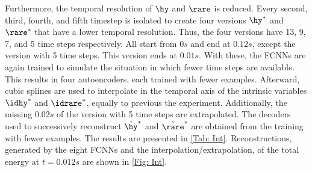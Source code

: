 Furthermore, the temporal resolution of \(\hy\) and \(\rare\) is reduced. Every second, third, fourth, and fifth timestep is isolated to create four versions \(\hy^*\) and \(\rare^*\) that have a lower temporal resolution. Thus, the four versions have 13, 9, 7, and 5 time steps respectively. All start from \(0s\) and end at \(0.12s\), except the version with 5 time steps. This version ends at \(0.01s\). With these, the FCNNs are again trained to simulate the situation in which fewer time steps are available. This results in four autoencoders, each trained with fewer examples. Afterward, cubic splines are used to interpolate in the temporal axis of the intrinsic variables \(\idhy^*\) and \(\idrare^*\), equally to previous the experiment. Additionally, the missing \(0.02s\)  of the version with 5 time steps are extrapolated. The decoders used to successively reconstruct \(\tilde{\hy}^*\) and \(\tilde{\rare}^*\) are obtained from the training with fewer examples. The results are presented in \cref{Tab: Int}. Reconstructions, generated by the eight FCNNs and the interpolation/extrapolation, of the total energy at \(t=0.012s\) are shown in \cref{Fig: Int}.\\

